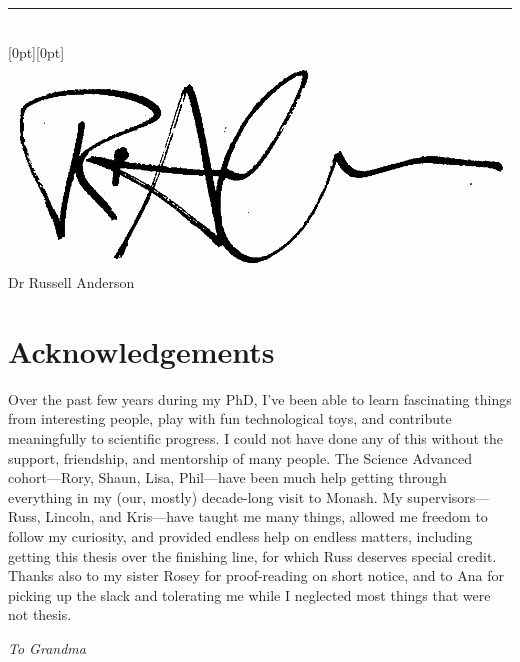 \begin{center}
\vspace{1.5cm}
\rule{8cm}{1pt}\\
\raisebox{0.5cm}[0pt][0pt]{\includegraphics[scale=0.1]{submission/rpa}}\\
Dr Russell Anderson 

\end{center}

\chapter*{Acknowledgements}

Over the past few years during my PhD, I've been able to learn fascinating things from interesting people, play with fun technological toys, and contribute meaningfully to scientific progress. I could not have done any of this without the support, friendship, and mentorship of many people. The Science Advanced cohort---Rory, Shaun, Lisa, Phil---have been much help getting through everything in my (our, mostly) decade-long visit to Monash. My supervisors---Russ, Lincoln, and Kris---have taught me many things, allowed me freedom to follow my curiosity, and provided endless help on endless matters, including getting this thesis over the finishing line, for which Russ deserves special credit. Thanks also to my sister Rosey for proof-reading on short notice, and to Ana for picking up the slack and tolerating me while I neglected most things that were not thesis.

\cleardoublepage

\thispagestyle{empty}
\vspace*{\fill}
\begin{center}\emph{To Grandma}
\end{center}
\vspace{\fill}
\restoregeometry

\cleardoublepage

\tableofcontents
\cleardoublepage
{}
